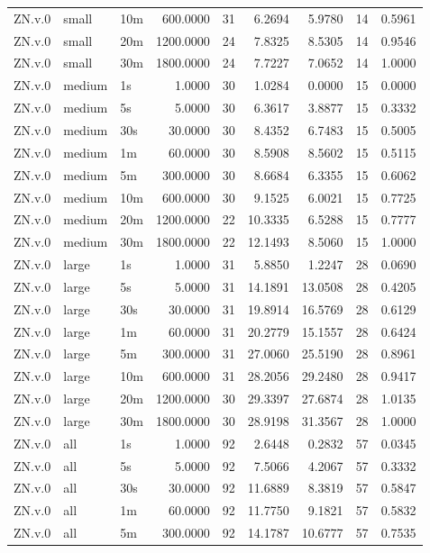 \begin{tabular}{lllrrrrrr}
ZN.v.0 & small & 10m & 600.0000 & 31 & 6.2694 & 5.9780 & 14 & 0.5961 \\
ZN.v.0 & small & 20m & 1200.0000 & 24 & 7.8325 & 8.5305 & 14 & 0.9546 \\
ZN.v.0 & small & 30m & 1800.0000 & 24 & 7.7227 & 7.0652 & 14 & 1.0000 \\
ZN.v.0 & medium & 1s & 1.0000 & 30 & 1.0284 & 0.0000 & 15 & 0.0000 \\
ZN.v.0 & medium & 5s & 5.0000 & 30 & 6.3617 & 3.8877 & 15 & 0.3332 \\
ZN.v.0 & medium & 30s & 30.0000 & 30 & 8.4352 & 6.7483 & 15 & 0.5005 \\
ZN.v.0 & medium & 1m & 60.0000 & 30 & 8.5908 & 8.5602 & 15 & 0.5115 \\
ZN.v.0 & medium & 5m & 300.0000 & 30 & 8.6684 & 6.3355 & 15 & 0.6062 \\
ZN.v.0 & medium & 10m & 600.0000 & 30 & 9.1525 & 6.0021 & 15 & 0.7725 \\
ZN.v.0 & medium & 20m & 1200.0000 & 22 & 10.3335 & 6.5288 & 15 & 0.7777 \\
ZN.v.0 & medium & 30m & 1800.0000 & 22 & 12.1493 & 8.5060 & 15 & 1.0000 \\
ZN.v.0 & large & 1s & 1.0000 & 31 & 5.8850 & 1.2247 & 28 & 0.0690 \\
ZN.v.0 & large & 5s & 5.0000 & 31 & 14.1891 & 13.0508 & 28 & 0.4205 \\
ZN.v.0 & large & 30s & 30.0000 & 31 & 19.8914 & 16.5769 & 28 & 0.6129 \\
ZN.v.0 & large & 1m & 60.0000 & 31 & 20.2779 & 15.1557 & 28 & 0.6424 \\
ZN.v.0 & large & 5m & 300.0000 & 31 & 27.0060 & 25.5190 & 28 & 0.8961 \\
ZN.v.0 & large & 10m & 600.0000 & 31 & 28.2056 & 29.2480 & 28 & 0.9417 \\
ZN.v.0 & large & 20m & 1200.0000 & 30 & 29.3397 & 27.6874 & 28 & 1.0135 \\
ZN.v.0 & large & 30m & 1800.0000 & 30 & 28.9198 & 31.3567 & 28 & 1.0000 \\
ZN.v.0 & all & 1s & 1.0000 & 92 & 2.6448 & 0.2832 & 57 & 0.0345 \\
ZN.v.0 & all & 5s & 5.0000 & 92 & 7.5066 & 4.2067 & 57 & 0.3332 \\
ZN.v.0 & all & 30s & 30.0000 & 92 & 11.6889 & 8.3819 & 57 & 0.5847 \\
ZN.v.0 & all & 1m & 60.0000 & 92 & 11.7750 & 9.1821 & 57 & 0.5832 \\
ZN.v.0 & all & 5m & 300.0000 & 92 & 14.1787 & 10.6777 & 57 & 0.7535 \\

\end{tabular}
